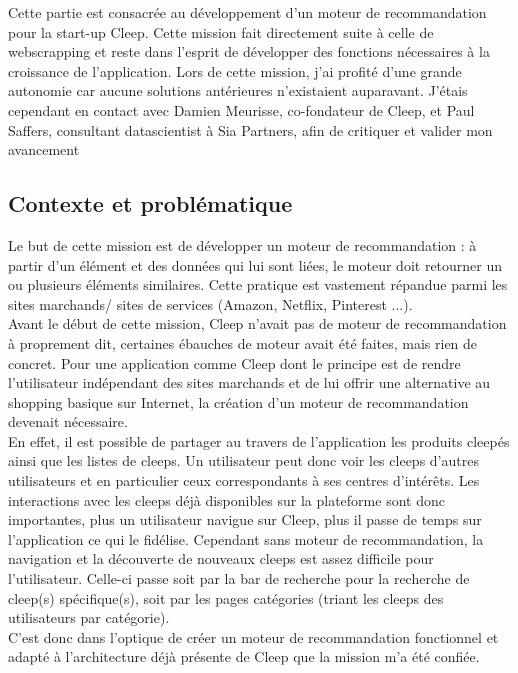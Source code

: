 \documentclass{article} %
\begin{document}
Cette partie est consacrée au développement d'un moteur de recommandation pour la start-up Cleep. Cette mission fait directement suite à celle de webscrapping et reste dans l'esprit de développer des fonctions nécessaires à la croissance de l'application. Lors de cette mission, j'ai profité d'une grande autonomie car aucune solutions antérieures n'existaient auparavant. J'étais cependant en contact avec Damien Meurisse, co-fondateur de Cleep, et Paul Saffers, consultant datascientist à Sia Partners, afin de critiquer et valider mon avancement 

\subsection{Contexte et problématique}

Le but de cette mission est de développer un moteur de recommandation : à partir d'un élément et des données qui lui sont liées, le moteur doit retourner un ou plusieurs éléments similaires. Cette pratique est vastement répandue parmi les sites marchands/ sites de services (Amazon, Netflix, Pinterest ...).\\

Avant le début de cette mission, Cleep n'avait pas de moteur de recommandation à proprement dit, certaines ébauches de moteur avait été faites, mais rien de concret. Pour une application comme Cleep dont le principe est de rendre l'utilisateur indépendant des sites marchands et de lui offrir une alternative au shopping basique sur Internet, la création d'un moteur de recommandation devenait nécessaire.\\
En effet, il est possible de partager au travers de l'application les produits cleepés ainsi que les listes de cleeps. Un utilisateur peut donc voir les cleeps d'autres utilisateurs et en particulier ceux correspondants à ses centres d'intérêts. Les interactions avec les cleeps déjà disponibles sur la plateforme sont donc importantes, plus un utilisateur navigue sur Cleep, plus il passe de temps sur l'application ce qui le fidélise. Cependant sans moteur de recommandation, la navigation et la découverte de nouveaux cleeps est assez difficile pour l'utilisateur. Celle-ci passe soit par la bar de recherche pour la recherche de cleep(s) spécifique(s), soit par les pages catégories (triant les cleeps des utilisateurs par catégorie).\\
C'est donc dans l'optique de créer un moteur de recommandation fonctionnel et adapté à l'architecture déjà présente de Cleep que la mission m'a été confiée.
\end{document}
